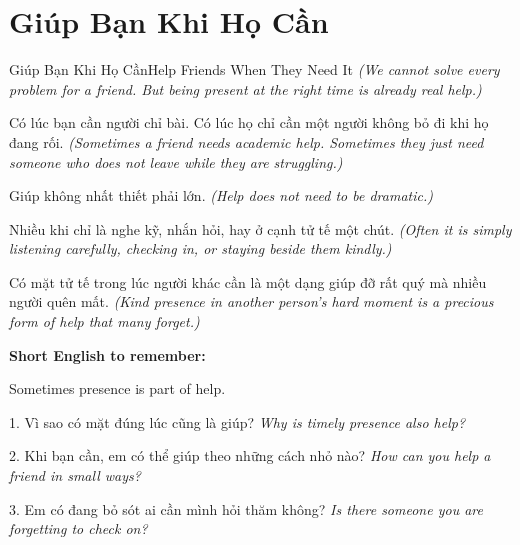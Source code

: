 \section{Giúp Bạn Khi Họ Cần}
\begin{truyen}{Giúp Bạn Khi Họ Cần}{Help Friends When They Need It}
\textit{(We cannot solve every problem for a friend. But being present at the right time is already real help.)}

Có lúc bạn cần người chỉ bài. Có lúc họ chỉ cần một người không bỏ đi khi họ đang rối.
\textit{(Sometimes a friend needs academic help. Sometimes they just need someone who does not leave while they are struggling.)}

Giúp không nhất thiết phải lớn.
\textit{(Help does not need to be dramatic.)}

Nhiều khi chỉ là nghe kỹ, nhắn hỏi, hay ở cạnh tử tế một chút.
\textit{(Often it is simply listening carefully, checking in, or staying beside them kindly.)}
\end{truyen}

\begin{baihoc}
Có mặt tử tế trong lúc người khác cần là một dạng giúp đỡ rất quý mà nhiều người quên mất.
\textit{(Kind presence in another person's hard moment is a precious form of help that many forget.)}
\end{baihoc}

\begin{ghinhoanh}
\textbf{Short English to remember:}

Sometimes presence is part of help.

\end{ghinhoanh}

\begin{tuhocnhanh}
1. Vì sao có mặt đúng lúc cũng là giúp? \textit{Why is timely presence also help?}

2. Khi bạn cần, em có thể giúp theo những cách nhỏ nào? \textit{How can you help a friend in small ways?}

3. Em có đang bỏ sót ai cần mình hỏi thăm không? \textit{Is there someone you are forgetting to check on?}
\end{tuhocnhanh}
\ngancach

